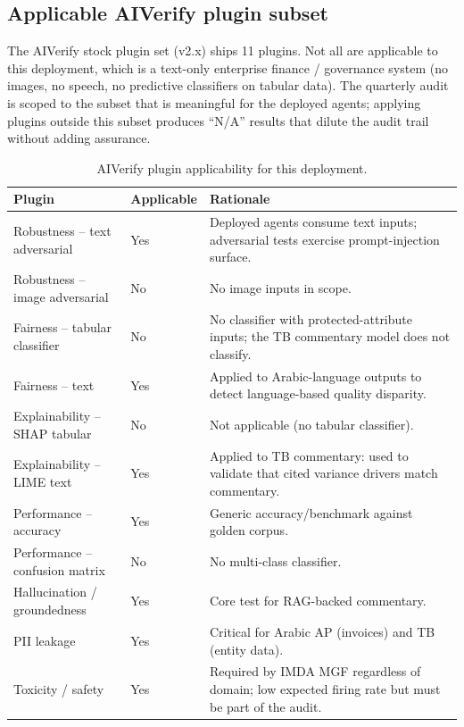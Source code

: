 \subsection{Applicable AIVerify plugin subset}\label{sec:aiverify-subset}

The AIVerify stock plugin set (v2.x) ships 11 plugins. Not all are
applicable to this deployment, which is a text-only enterprise
finance / governance system (no images, no speech, no predictive
classifiers on tabular data). The quarterly audit is scoped to the
subset that is meaningful for the deployed agents; applying
plugins outside this subset produces ``N/A'' results that dilute
the audit trail without adding assurance.

\begin{table}[htbp]
\centering
\caption{AIVerify plugin applicability for this deployment.}
\label{tab:aiverify-subset}
\footnotesize
\begin{tabularx}{\linewidth}{@{}l l X@{}}
\toprule
\textbf{Plugin} & \textbf{Applicable} & \textbf{Rationale} \\ \midrule
Robustness -- text adversarial & Yes & Deployed agents consume text inputs; adversarial tests exercise prompt-injection surface. \\
Robustness -- image adversarial & No & No image inputs in scope. \\
Fairness -- tabular classifier & No & No classifier with protected-attribute inputs; the TB commentary model does not classify. \\
Fairness -- text & Yes & Applied to Arabic-language outputs to detect language-based quality disparity. \\
Explainability -- SHAP tabular & No & Not applicable (no tabular classifier). \\
Explainability -- LIME text & Yes & Applied to TB commentary: used to validate that cited variance drivers match commentary. \\
Performance -- accuracy & Yes & Generic accuracy/benchmark against golden corpus. \\
Performance -- confusion matrix & No & No multi-class classifier. \\
Hallucination / groundedness & Yes & Core test for RAG-backed commentary. \\
PII leakage & Yes & Critical for Arabic AP (invoices) and TB (entity data). \\
Toxicity / safety & Yes & Required by IMDA MGF regardless of domain; low expected firing rate but must be part of the audit. \\
\bottomrule
\end{tabularx}
\end{table}

